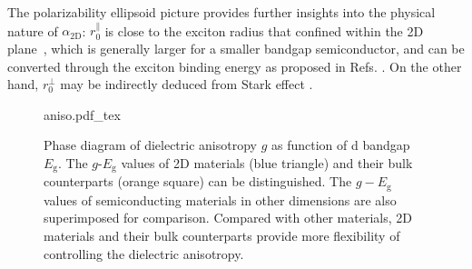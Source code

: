 The polarizability ellipsoid picture provides further insights into
the physical nature of $\alpha_{\mathrm{2D}}$: $r_{0}^{\parallel}$ is
close to the exciton radius that confined within the 2D
plane~\autocite{Pulci_2014_exciton}, which is generally larger for a
smaller bandgap semiconductor, and can be converted through the
exciton binding energy as proposed in
Refs. \cite{Olsen_2016_hydrogen,Jiang_2017_Eg_Eb}. On the other hand,
$r_{0}^{\perp}$ may be indirectly deduced from Stark effect
\autocite{Pedersen_2016_shark_effect_TMDC,Klein_2016_stark_eff,Roch_2018_stark_eff}.

\begin{figure}[!htbp]
  \centering
  {aniso.pdf_tex}
  \caption{Phase diagram of dielectric anisotropy $g$ as function of
d    bandgap $E_{\mathrm{g}}$. The $g$-$E_{\mathrm{g}}$ values of 2D
    materials (blue triangle) and their bulk counterparts (orange
    square) can be distinguished. The $g-E_{\mathrm{g}}$
    values of semiconducting materials in other dimensions are also
    superimposed for comparison.
    Compared with other materials,
    2D materials and their bulk counterparts provide more flexibility
    of controlling the dielectric anisotropy.}
  \label{fig:diele-aniso}
\end{figure}

